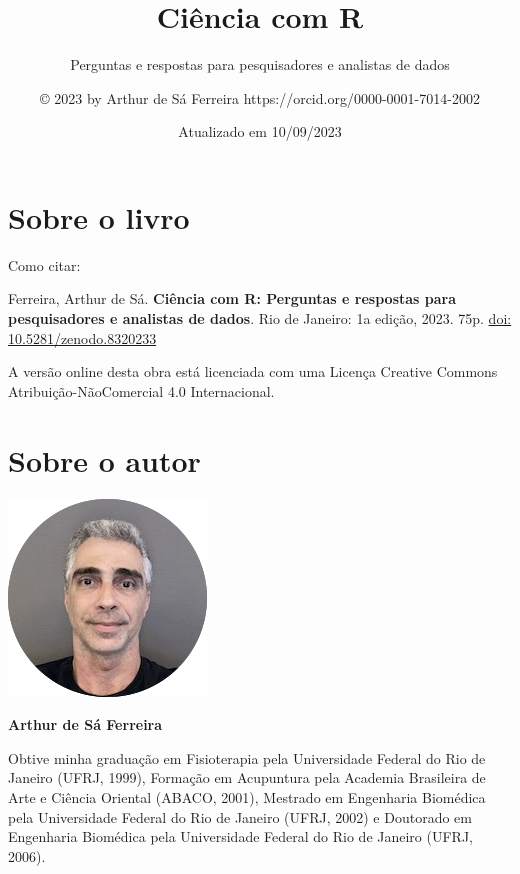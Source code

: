 \documentclass[
]{book}
\title{\textbf{Ciência com R}}
\subtitle{Perguntas e respostas para pesquisadores e analistas de dados}
\author{© 2023 by Arthur de Sá Ferreira https://orcid.org/0000-0001-7014-2002}
\date{Atualizado em 10/09/2023}
\begin{document}
\maketitle


\newpage

{
\setcounter{tocdepth}{1}
\tableofcontents
}
\hypertarget{sobre-o-livro}{%
\chapter*{Sobre o livro}\label{sobre-o-livro}}

Como citar:

Ferreira, Arthur de Sá. \textbf{Ciência com R: Perguntas e respostas para pesquisadores e analistas de dados}. Rio de Janeiro: 1a edição, 2023. 75p. \href{https://zenodo.org/badge/latestdoi/685181979}{doi: 10.5281/zenodo.8320233}

A versão online desta obra está licenciada com uma Licença Creative Commons Atribuição-NãoComercial 4.0 Internacional.

\hypertarget{sobre-o-autor}{%
\chapter*{Sobre o autor}\label{sobre-o-autor}}

\includegraphics{ASF.png}

\textbf{Arthur de Sá Ferreira}

Obtive minha graduação em Fisioterapia pela Universidade Federal do Rio de Janeiro (UFRJ, 1999), Formação em Acupuntura pela Academia Brasileira de Arte e Ciência Oriental (ABACO, 2001), Mestrado em Engenharia Biomédica pela Universidade Federal do Rio de Janeiro (UFRJ, 2002) e Doutorado em Engenharia Biomédica pela Universidade Federal do Rio de Janeiro (UFRJ, 2006).
\end{document}
